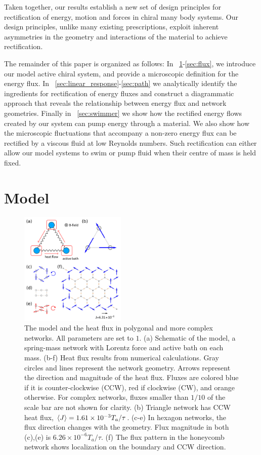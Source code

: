 \documentclass[
 preprint,
 preprintnumbers,
 amsmath,amssymb,
 aps,
 pre,
 longbibliography,
 superscriptaddress,
 10pt, twocolumn
]{revtex4-1}
\begin{document}
Taken together, our results establish a new set of design principles for rectification of energy, motion and forces in chiral many body systems. Our design principles, unlike many existing prescriptions, exploit inherent asymmetries in the geometry and interactions of the material to achieve rectification.


The remainder of this paper is organized as follows:
In \secname~\ref{sec:model}-\ref{sec:flux}, we introduce our model active chiral system, and provide a microscopic definition for the energy flux. 
In \secname~\ref{sec:linear_response}-\ref{sec:path} we analytically identify the ingredients for rectification of energy fluxes and construct a diagrammatic approach that reveals the relationship between energy flux and network geometries.
Finally in \secname~\ref{sec:swimmer} we show how the rectified energy flows created by our system can pump energy through a material. We also show how the microscopic fluctuations that accompany a non-zero energy flux can be rectified by a viscous fluid at low Reynolds numbers. Such rectification can either allow our model systems to swim or pump fluid when their centre of mass is held fixed. 


\section{Model} \label{sec:model}

\begin{figure}[ht]
	\centering
	\includegraphics[width=0.45\textwidth]{1_model_and_result.pdf}
    \caption{The model and the heat flux in polygonal and more complex networks. All parameters are set to $1$.
    (a) Schematic of the model, a spring-mass network with Lorentz force and active bath on each mass.
    (b-f) Heat flux results from numerical calculations. Gray circles and lines represent the network geometry. Arrows represent the direction and magnitude of the heat flux. Fluxes are colored blue if it is counter-clockwise (CCW), red if clockwise (CW), and orange otherwise. For complex networks, fluxes smaller than $1/10$ of the scale bar are not shown for clarity.
    (b) Triangle network has CCW heat flux, $\expval{J}=1.61\times 10^{-3} T_a/\tau$.
    (c-e) In hexagon networks, the flux direction changes with the geometry. Flux magnitude in both (c),(e) is $6.26\times 10^{-6} T_a/\tau$.
    (f) The flux pattern in the honeycomb network shows localization on the boundary and CCW direction.
    }
    \label{fig:model_and_result}
\end{figure}
\end{document}
